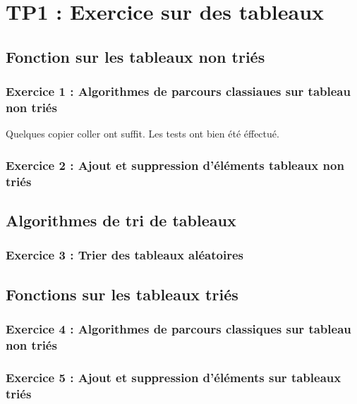 \chapter{TP1 : Exercice sur des tableaux}
    \section{Fonction sur les tableaux non triés}
        \subsection{Exercice 1 : Algorithmes de parcours classiaues sur tableau non triés}
	    Quelques copier coller ont suffit.
            Les tests ont bien été éffectué.
        \subsection{Exercice 2 : Ajout et suppression d'éléments tableaux non triés}
    \section{Algorithmes de tri de tableaux}
        \subsection{Exercice 3 : Trier des tableaux aléatoires}
    \section{Fonctions sur les tableaux triés}
        \subsection{Exercice 4 : Algorithmes de parcours classiques sur tableau non triés}
        \subsection{Exercice 5 : Ajout et suppression d’éléments sur tableaux triés}
